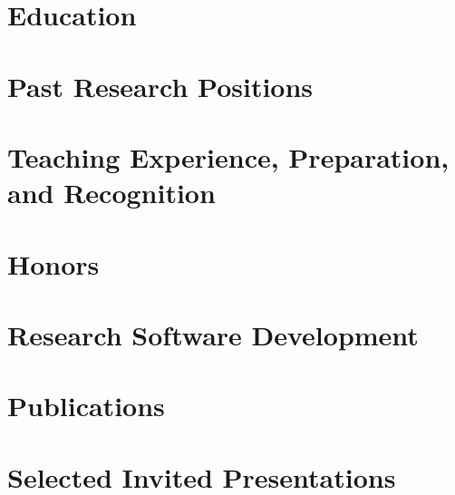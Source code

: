 


\thispagestyle{empty}					%
\pagestyle{fancy}			 		%

\vspace*{-0.8cm}
\centering 


\vspace{-2mm}
\section{Education}
\def\edsep{-1.5mm}


\vspace{-1mm}
\section{Past Research Positions}


\vspace{-1mm}
\section{Teaching Experience, Preparation, and Recognition}


\section{Honors}


\vspace{-2mm}
\section{Research Software Development}


\vspace{-1mm}
\section{Publications}


\section{Selected Invited Presentations}
\def\talksep{-1.8mm}
\def\talkyearsep{-1mm}


